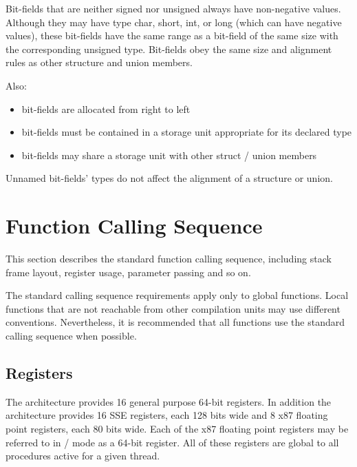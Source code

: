 Bit-fields that are neither signed nor unsigned
always have non-negative values. Although they may have type char,
short, int, or long (which can have negative values), these bit-fields
have the same range as a bit-field of the same size with the
corresponding unsigned type. Bit-fields obey the same size and
alignment rules as other structure and union members.

Also:
\begin{itemize}
 \item bit-fields are allocated from right to left
 \item bit-fields must be contained in a storage unit appropriate 
       for its declared type
 \item bit-fields may share a storage unit with other struct / union members
\end{itemize}

Unnamed bit-fields' types do not affect the alignment of a structure
or union.


\section{Function Calling Sequence}

This section describes the standard function calling sequence,
including stack frame layout, register usage, parameter passing and so
on.

The standard calling sequence requirements apply only to global
functions.  Local functions that are not reachable from other
compilation units may use different conventions.  Nevertheless, it is
recommended that all functions use the standard calling sequence when
possible.

\subsection{Registers}
\label{subsec-registers}

The \xARCH architecture provides 16 general purpose 64-bit registers.
In addition the architecture provides 16 SSE registers, each 128 bits
wide and 8 x87 floating point registers, each 80 bits wide.  Each of
the x87 floating point registers may be referred to in \MMX/\threednow
mode as a 64-bit register.  All of these registers are global to all
procedures active for a given thread.

